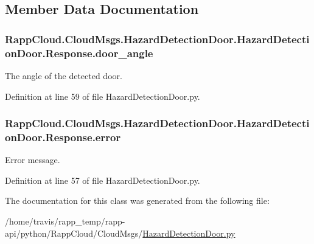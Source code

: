 \subsection{Member Data Documentation}
\hypertarget{classRappCloud_1_1CloudMsgs_1_1HazardDetectionDoor_1_1HazardDetectionDoor_1_1Response_a235e046c21b539cb0702fbc26d1d9043}{
\subsubsection[{door\-\_\-angle}]{\setlength{\rightskip}{0pt plus 5cm}Rapp\-Cloud.\-Cloud\-Msgs.\-Hazard\-Detection\-Door.\-Hazard\-Detection\-Door.\-Response.\-door\-\_\-angle}}\label{classRappCloud_1_1CloudMsgs_1_1HazardDetectionDoor_1_1HazardDetectionDoor_1_1Response_a235e046c21b539cb0702fbc26d1d9043}


The angle of the detected door. 



Definition at line 59 of file Hazard\-Detection\-Door.\-py.

\hypertarget{classRappCloud_1_1CloudMsgs_1_1HazardDetectionDoor_1_1HazardDetectionDoor_1_1Response_a122f14665538bcff10f50d4bd2ace299}{
\subsubsection[{error}]{\setlength{\rightskip}{0pt plus 5cm}Rapp\-Cloud.\-Cloud\-Msgs.\-Hazard\-Detection\-Door.\-Hazard\-Detection\-Door.\-Response.\-error}}\label{classRappCloud_1_1CloudMsgs_1_1HazardDetectionDoor_1_1HazardDetectionDoor_1_1Response_a122f14665538bcff10f50d4bd2ace299}


Error message. 



Definition at line 57 of file Hazard\-Detection\-Door.\-py.



The documentation for this class was generated from the following file\-:\begin{DoxyCompactItemize}
\item 
/home/travis/rapp\-\_\-temp/rapp-\/api/python/\-Rapp\-Cloud/\-Cloud\-Msgs/\hyperlink{HazardDetectionDoor_8py}{Hazard\-Detection\-Door.\-py}\end{DoxyCompactItemize}
